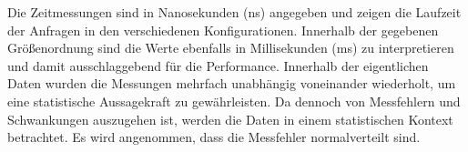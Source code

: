 \begin{table}[!htp]
    \centering
    \caption{Auszug der Daten der Performance-Messung.}
    \label{tab:performance-data}
\end{table}
\FloatBarrier

Die Zeitmessungen sind in Nanosekunden (ns) angegeben und zeigen die Laufzeit der Anfragen in den verschiedenen Konfigurationen.
Innerhalb der gegebenen Größenordnung sind die Werte ebenfalls in Millisekunden (ms) zu interpretieren und damit ausschlaggebend für die Performance.
Innerhalb der eigentlichen Daten wurden die Messungen mehrfach unabhängig voneinander wiederholt, um eine statistische Aussagekraft zu gewährleisten.
Da dennoch von Messfehlern und Schwankungen auszugehen ist, werden die Daten in einem statistischen Kontext betrachtet.
Es wird angenommen, dass die Messfehler normalverteilt sind.

